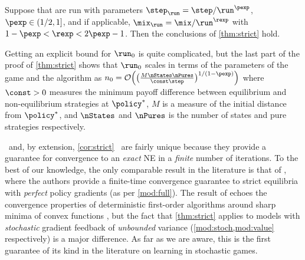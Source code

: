 \begin{corollary}
\label{cor:strict}
Suppose that  are run with parameters $\curr[\step] = \step/\run^{\pexp}$, $\pexp\in(1/2,1]$, and if applicable, $\curr[\mix] = \mix/\run^{\rexp}$ with $1-\pexp < \rexp < 2\pexp-1$.
Then the conclusions of \cref{thm:strict} hold.
\end{corollary}

\beginrev
\begin{remark}
Getting an explicit bound for $\run_{0}$ is quite complicated, but the last part of the proof of \cref{thm:strict} shows that $\run_{0}$ scales in terms of the parameters of the game and the algorithm as $n_0 = \bigoh\parens[\Big]{\parens[\big]{\frac{M\nStates\nPures}{\const\step}}^{1/(1-\pexp)}}$ where $\const>0$ measures the minimum payoff difference between equilibrium and non-equilibrium strategies at $\eq$, $M$ is a measure of the initial distance from $\eq$, and $\nStates$ and $\nPures$ is the number of states and pure strategies respectively.
\end{remark}
\endedit

 \textendash\ and, by extension, \cref{cor:strict} \textendash\ are fairly unique because they provide a guarantee for convergence to an \emph{exact} \acl{NE} in a \emph{finite} number of iterations.
To the best of our knowledge, the only comparable result in the literature is that of \cite{zhang2021gradient}, where the authors provide a finite-time convergence guarantee to strict equilibria with \emph{perfect} policy gradients (as per \cref{mod:full}).
The result of \citet{zhang2021gradient} echoes the convergence properties of deterministic first-order algorithms around sharp minima of convex functions \cite{Pol87}, but the fact that \cref{thm:strict} applies to models with \emph{stochastic} gradient feedback of \emph{unbounded} variance (\cref{mod:stoch,mod:value} respectively) is a major difference.
As far as we are aware, this is the first guarantee of its kind in the literature on learning in stochastic games.